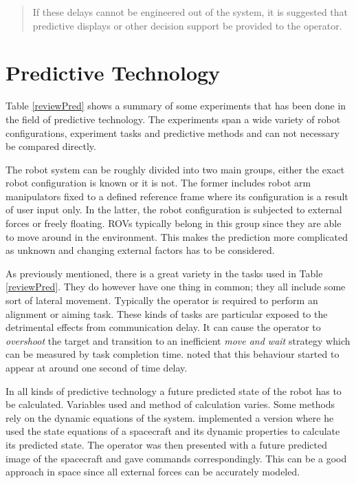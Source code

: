 \begin{quote}
\small If these delays cannot be engineered out of the system, it is suggested that predictive displays or other decision support be provided to the operator.
\end{quote}


\section{Predictive Technology}



Table \ref{reviewPred} shows a summary of some experiments that has been done in the field of predictive technology. The experiments span a wide variety of robot configurations, experiment tasks and predictive methods and can not necessary be compared directly.

The robot system can be roughly divided into two main groups, either the exact robot configuration is known or it is not. The former includes robot arm manipulators fixed to a defined reference frame where its configuration is a result of user input only. In the latter, the robot configuration is subjected to external forces or freely floating. ROVs typically belong in this group since they are able to move around in the environment. This makes the prediction more complicated as unknown and changing external factors has to be considered.

As previously mentioned, there is a great variety in the tasks used in Table \ref{reviewPred}. They do however have one thing in common; they all include some sort of lateral movement. Typically the operator is required to perform an alignment or aiming task. These kinds of tasks are particular exposed to the detrimental effects from communication delay. It can cause the operator to \emph{overshoot} the target and transition to an inefficient \emph{move and wait} strategy which can be measured by task completion time. \citet{Lane2002} noted that this behaviour started to appear at around one second of time delay.

In all kinds of predictive technology a future predicted state of the robot has to be calculated. Variables used and method of calculation varies. Some methods rely on the dynamic equations of the system. \citet{Zhang2017} implemented a version where he used the state equations of a spacecraft and its dynamic properties to calculate its predicted state. The operator was then presented with a future predicted image of the spacecraft and gave commands correspondingly. This can be a good approach in space since all external forces can be accurately modeled.

